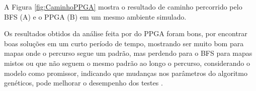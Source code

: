 A Figura \ref{fig:CaminhoPPGA} mostra o resultado de caminho percorrido pelo BFS (A) e o PPGA (B) em um mesmo ambiente simulado. 


\begin{minipage}{\linewidth}
	\label{fig:CaminhoPPGA}
\end{minipage}

Os resultados obtidos da análise feita por \cite{Ulysses} do PPGA foram bons, por encontrar boas soluções em um curto período de tempo, mostrando ser muito bom para mapas onde o percurso segue um padrão, mas perdendo para o BFS para mapas mistos ou que não seguem o mesmo padrão ao longo o percurso, considerando o modelo como promissor, indicando que mudanças nos parâmetros do algoritmo genéticos, pode melhorar o desempenho dos testes \cite{Ulysses}.

